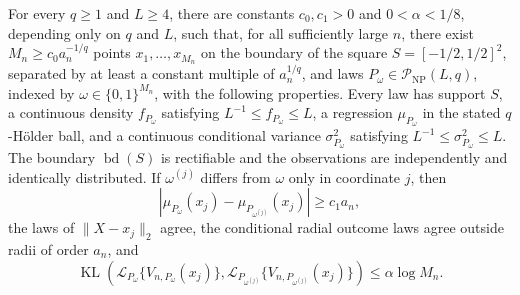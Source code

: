 For every \(q\geq1\) and \(L\geq4\), there are constants \(c_0,c_1>0\) and \(0<\alpha<1/8\), depending only on \(q\) and \(L\), such that, for all sufficiently large \(n\), there exist \(M_n\geq c_0a_n^{-1/q}\) points \(x_1,\ldots,x_{M_n}\) on the boundary of the square \(S=[-1/2,1/2]^2\), separated by at least a constant multiple of \(a_n^{1/q}\), and laws \(P_\omega\in\mathcal P_{\mathrm{NP}}(L,q)\), indexed by \(\omega\in\{0,1\}^{M_n}\), with the following properties.  Every law has support \(S\), a continuous density \(f_{P_\omega}\) satisfying \(L^{-1}\leq f_{P_\omega}\leq L\), a regression \(\mu_{P_\omega}\) in the stated \(q\)-H\"older ball, and a continuous conditional variance \(\sigma^2_{P_\omega}\) satisfying \(L^{-1}\leq\sigma^2_{P_\omega}\leq L\).  The boundary \(\operatorname{bd}(S)\) is rectifiable and the observations are independently and identically distributed.  If \(\omega^{(j)}\) differs from \(\omega\) only in coordinate \(j\), then
\[
 \left|\mu_{P_\omega}(x_j)-\mu_{P_{\omega^{(j)}}}(x_j)\right|\geq c_1a_n,
\]
the laws of \(\lVert X-x_j\rVert_2\) agree, the conditional radial outcome laws agree outside radii of order \(a_n\), and
\[
 \operatorname{KL}\!\left(\mathcal L_{P_\omega}\{V_{n,P_\omega}(x_j)\},
 \mathcal L_{P_{\omega^{(j)}}}\{V_{n,P_{\omega^{(j)}}}(x_j)\}\right)
 \leq\alpha\log M_n.
\]